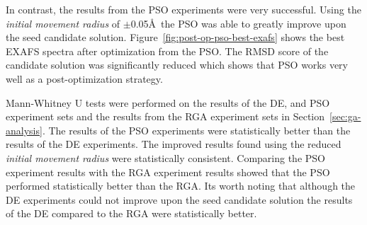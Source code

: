 In contrast, the results from the PSO experiments were very successful. Using the \textit{initial movement radius} of $\pm$0.05\AA\ the PSO was able to greatly improve upon the seed candidate solution. Figure~\ref{fig:post-op-pso-best-exafs} shows the best EXAFS spectra after optimization from the PSO. The RMSD score of the candidate solution was significantly reduced which shows that PSO works very well as a post-optimization strategy.

\begin{figure*}
	\centering
	\caption{OEC EXAFS Spectra Comparison}
	\label{fig:post-op-pso-best-exafs}
\end{figure*}

Mann-Whitney U tests were performed on the results of the DE, and PSO experiment sets and the results from the RGA experiment sets in Section~\ref{sec:ga-analysis}. The results of the PSO experiments were statistically better than the results of the DE experiments. The improved results found using the reduced \textit{initial movement radius} were statistically consistent. Comparing the PSO experiment results with the RGA experiment results showed that the PSO performed statistically better than the RGA. Its worth noting that although the DE experiments could not improve upon the seed candidate solution the results of the DE compared to the RGA were statistically better.